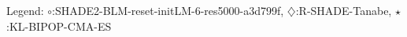 Legend: {\color{NavyBlue}$\circ$}:SHADE2-BLM-reset-initLM-6-res5000-a3d799f, {\color{Magenta}$\diamondsuit$}:R-SHADE-Tanabe, {\color{Orange}$\star$}:KL-BIPOP-CMA-ES
